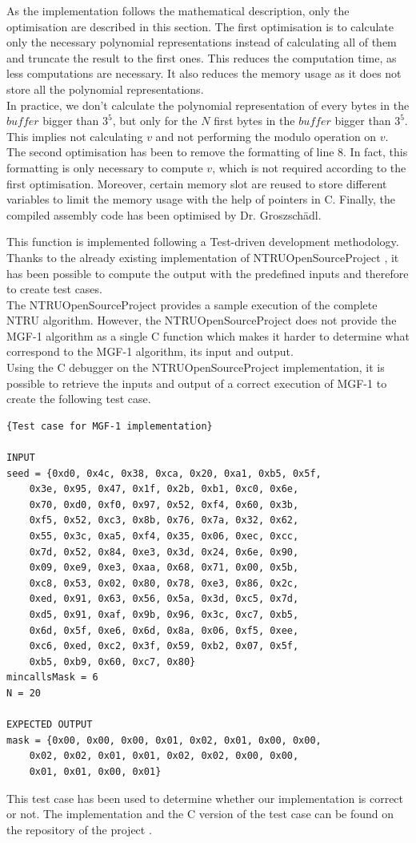 As the implementation follows the mathematical description, only the optimisation are described in this section.
The first optimisation is to calculate only the necessary polynomial representations instead of calculating all of them and truncate the result to the first ones. This reduces the computation time, as less computations are necessary. It also reduces the memory usage as it does not store all the polynomial representations.\\ In practice, we don't calculate the polynomial representation of every bytes in the $buffer$ bigger than $3^5$, but only for the $N$ first bytes in the $buffer$ bigger than $3^5$. This implies not calculating $v$ and not performing the modulo operation on $v$.\\ 
The second optimisation has been to remove the formatting of line 8. In fact, this formatting is only necessary to compute $v$, which is not required according to the first optimisation.
Moreover, certain memory slot are reused to store different variables to limit the memory usage with the help of pointers in C.
Finally, the compiled assembly code has been optimised by Dr. Groszsch\"adl.


This function is implemented following a Test-driven development methodology. Thanks to the already existing implementation of NTRUOpenSourceProject \cite{noauthor_open_2018}, it has been possible to compute the output with the predefined inputs and therefore to create test cases.\\ The NTRUOpenSourceProject provides a sample execution of the complete NTRU algorithm. However, the NTRUOpenSourceProject does not provide the MGF-1 algorithm as a single C function which makes it harder to determine what correspond to the MGF-1 algorithm, its input and output.\\ Using the C debugger on the NTRUOpenSourceProject implementation, it is possible to retrieve the inputs and output of a correct execution of MGF-1 to create the following test case.
\newpage
\begin{lstlisting}[style=base,frame=single,mathescape=true]
{Test case for MGF-1 implementation}

INPUT 
seed = {0xd0, 0x4c, 0x38, 0xca, 0x20, 0xa1, 0xb5, 0x5f,
	0x3e, 0x95, 0x47, 0x1f, 0x2b, 0xb1, 0xc0, 0x6e,
	0x70, 0xd0, 0xf0, 0x97, 0x52, 0xf4, 0x60, 0x3b,
	0xf5, 0x52, 0xc3, 0x8b, 0x76, 0x7a, 0x32, 0x62,
	0x55, 0x3c, 0xa5, 0xf4, 0x35, 0x06, 0xec, 0xcc,
	0x7d, 0x52, 0x84, 0xe3, 0x3d, 0x24, 0x6e, 0x90,
	0x09, 0xe9, 0xe3, 0xaa, 0x68, 0x71, 0x00, 0x5b,
	0xc8, 0x53, 0x02, 0x80, 0x78, 0xe3, 0x86, 0x2c,
	0xed, 0x91, 0x63, 0x56, 0x5a, 0x3d, 0xc5, 0x7d,
	0xd5, 0x91, 0xaf, 0x9b, 0x96, 0x3c, 0xc7, 0xb5,
	0x6d, 0x5f, 0xe6, 0x6d, 0x8a, 0x06, 0xf5, 0xee,
	0xc6, 0xed, 0xc2, 0x3f, 0x59, 0xb2, 0x07, 0x5f,
	0xb5, 0xb9, 0x60, 0xc7, 0x80}
mincallsMask = 6
N = 20

EXPECTED OUTPUT
mask = {0x00, 0x00, 0x00, 0x01, 0x02, 0x01, 0x00, 0x00, 
	0x02, 0x02, 0x01, 0x01, 0x02, 0x02, 0x00, 0x00,
	0x01, 0x01, 0x00, 0x01}
\end{lstlisting}

This test case has been used to determine whether our implementation is correct or not. The implementation and the C version of the test case can be found on the repository of the project \cite{simonetto_ntru_2018}.







